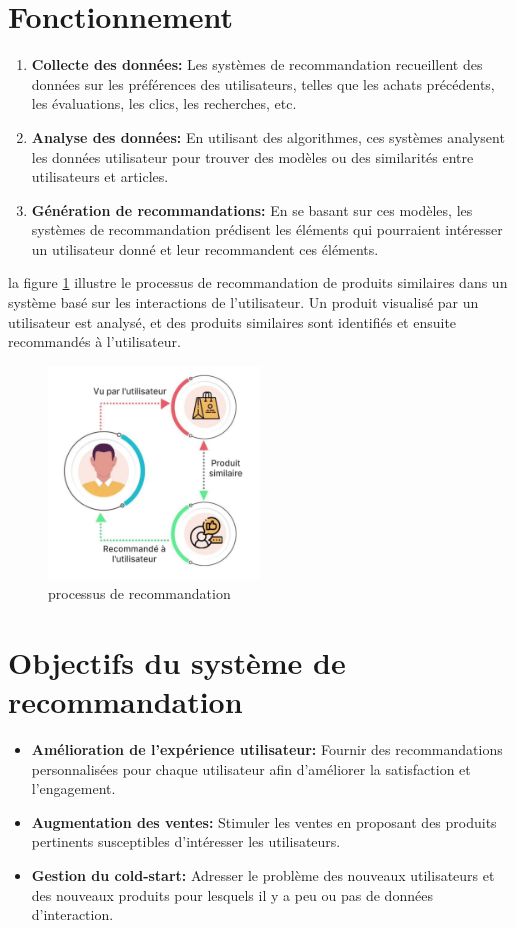 \documentclass[edit,12pt,a4paper,ChapStyle,oneside,doubleinterligne]{report}
\begin{document}
\section{Fonctionnement}
\begin{enumerate}
    \item \textbf{Collecte des données: }Les systèmes de recommandation recueillent des données sur les préférences des utilisateurs, telles que les achats précédents, les évaluations, les clics, les recherches, etc.
    \item \textbf{Analyse des données: }En utilisant des algorithmes, ces systèmes analysent les données utilisateur pour trouver des modèles ou des similarités entre utilisateurs et articles.
    \item \textbf{Génération de recommandations: }En se basant sur ces modèles, les systèmes de recommandation prédisent les éléments qui pourraient intéresser un utilisateur donné et leur recommandent ces éléments.
\end{enumerate}
la figure \ref{sr} illustre le processus de recommandation de produits similaires dans un système basé sur les interactions de l'utilisateur. Un produit visualisé par un utilisateur est analysé, et des produits similaires sont identifiés et ensuite recommandés à l'utilisateur.
\begin{figure}[H]
    \centering
    \includegraphics[width=0.5\textwidth]{images/recommendation system.jpg}
    \caption{processus de recommandation}\label{sr}
\end{figure}
\section{Objectifs du système de recommandation}
\begin{itemize}
    \item \textbf{Amélioration de l'expérience utilisateur: } Fournir des recommandations personnalisées pour chaque utilisateur afin d'améliorer la satisfaction et l'engagement.
    \item \textbf{Augmentation des ventes: } Stimuler les ventes en proposant des produits pertinents susceptibles d'intéresser les utilisateurs.
    \item \textbf{Gestion du cold-start: } Adresser le problème des nouveaux utilisateurs et des nouveaux produits pour lesquels il y a peu ou pas de données d'interaction.
\end{itemize}
\end{document}
